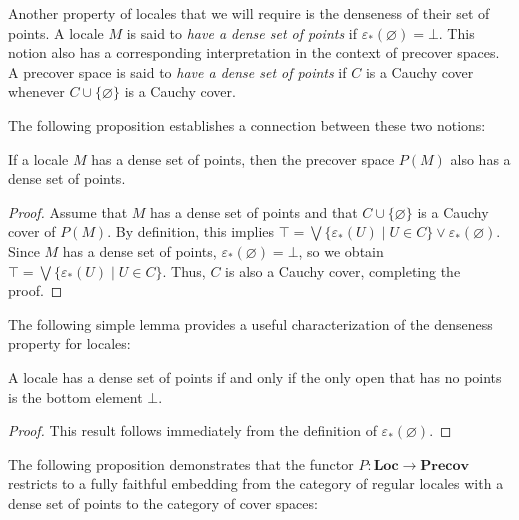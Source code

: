 \documentclass[reqno]{amsart}
\theoremstyle{definition}
\theoremstyle{remark}
\numberwithin{figure}{section}
\newcommand{\cat}[1]{\mathbf{#1}}
\begin{document}
Another property of locales that we will require is the denseness of their set of points.
A locale $M$ is said to \emph{have a dense set of points} if $\varepsilon_*(\varnothing) = \bot$.
This notion also has a corresponding interpretation in the context of precover spaces.
A precover space is said to \emph{have a dense set of points} if $C$ is a Cauchy cover whenever $C \cup \{ \varnothing \}$ is a Cauchy cover.

The following proposition establishes a connection between these two notions:

\begin{prop}
If a locale $M$ has a dense set of points, then the precover space $P(M)$ also has a dense set of points.
\end{prop}
\begin{proof}
Assume that $M$ has a dense set of points and that $C \cup \{ \varnothing \}$ is a Cauchy cover of $P(M)$.
By definition, this implies $\top = \bigvee \{ \varepsilon_*(U) \mid U \in C \} \vee \varepsilon_*(\varnothing)$.
Since $M$ has a dense set of points, $\varepsilon_*(\varnothing) = \bot$, so we obtain $\top = \bigvee \{ \varepsilon_*(U) \mid U \in C \}$.
Thus, $C$ is also a Cauchy cover, completing the proof.
\end{proof}

The following simple lemma provides a useful characterization of the denseness property for locales:

\begin{lem}
A locale has a dense set of points if and only if the only open that has no points is the bottom element $\bot$.
\end{lem}
\begin{proof}
This result follows immediately from the definition of $\varepsilon_*(\varnothing)$.
\end{proof}

The following proposition demonstrates that the functor $P : \cat{Loc} \to \cat{Precov}$ restricts to a fully faithful embedding from the category of regular locales with a dense set of points to the category of cover spaces:
\end{document}
